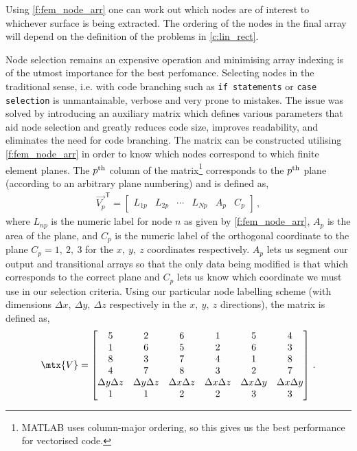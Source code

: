Using \cref{f:fem_node_arr} one can work out which nodes are of interest to whichever surface is being extracted. The ordering of the nodes in the final array will depend on the definition of the problems in \cref{c:lin_rect}.

Node selection remains an expensive operation and minimising array indexing is of the utmost importance for the best perfomance. Selecting nodes in the traditional sense, i.e. with code branching such as \texttt{if statements} or \texttt{case selection} is unmantainable, verbose and very prone to mistakes. The issue was solved by introducing an auxiliary matrix which defines various parameters that aid node selection and greatly reduces code size, improves readability, and eliminates the need for code branching. The matrix can be constructed utilising \cref{f:fem_node_arr} in order to know which nodes correspond to which finite element planes. The $ p\textsuperscript{th} $ column of the matrix\footnote{MATLAB uses column-major ordering, so this gives us the best performance for vectorised code.} corresponds to the $ p\textsuperscript{th} $ plane (according to an arbitrary plane numbering) and is defined as,
\begin{align}\label{eq:surf_node_util_vec}
	\vec{V_{p}}^{\mathsf{T}} =
	\begin{bmatrix}
		L_{1p} & L_{2p} & \cdots & L_{Np} & A_{p} & C_{p}
	\end{bmatrix}\,,
\end{align}
where $ L_{np} $ is the numeric label for node $ n $ as given by \cref{f:fem_node_arr}, $ A_{p} $ is the area of the plane, and $ C_{p} $ is the numeric label of the orthogonal coordinate to the plane $ C_{p} = 1, ~2, ~3 $ for the $ x, ~y, ~z $ coordinates respectively. $ A_{p} $ lets us segment our output and transitional arrays so that the only data being modified is that which corresponds to the correct plane and $ C_{p} $ lets us know which coordinate we must use in our selection criteria. Using our particular node labelling scheme (with dimensions $ \Delta x,~ \Delta y,~ \Delta z $ respectively in the $ x,~ y,~ z $ directions), the matrix is defined as,
\begin{align}\label{eq:surf_node_util}
	\mtx{V} =
	\begin{bmatrix}
		5                 & 2                 & 6                 & 1                 & 5                 & 4                 \\
		1                 & 6                 & 5                 & 2                 & 6                 & 3                 \\
		8                 & 3                 & 7                 & 4                 & 1                 & 8                 \\
		4                 & 7                 & 8                 & 3                 & 2                 & 7                 \\
		\Delta y \Delta z & \Delta y \Delta z & \Delta x \Delta z & \Delta x \Delta z & \Delta x \Delta y & \Delta x \Delta y \\
		1                 & 1                 & 2                 & 2                 & 3                 & 3
	\end{bmatrix}\,.
\end{align}
